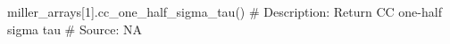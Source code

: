 miller_arrays[1].cc_one_half_sigma_tau()
# Description:  Return CC one-half sigma tau
# Source:  NA


